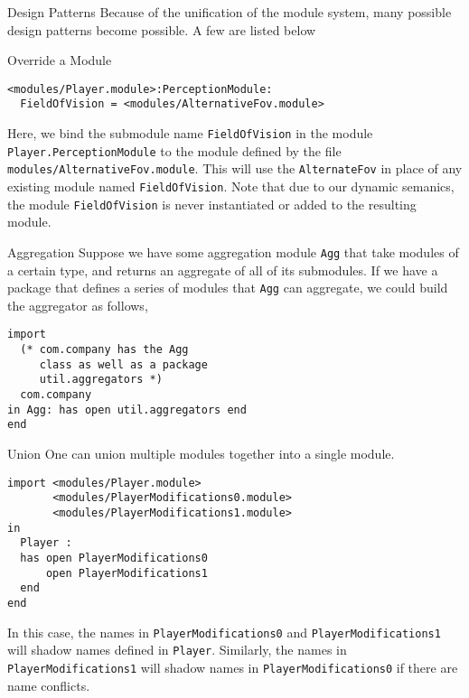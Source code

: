 \documentclass[11pt]{article}
\begin{document}
\begin{section}{Design Patterns}
Because of the unification of the module system, many possible design patterns become possible. A few are listed below
\begin{subsection}{Override a Module}
\begin{verbatim}
<modules/Player.module>:PerceptionModule:
  FieldOfVision = <modules/AlternativeFov.module>
\end{verbatim}
Here, we bind the submodule name \verb|FieldOfVision| in the module\\ \verb|Player.PerceptionModule| to the module defined by the file \\\verb|modules/AlternativeFov.module|. This will use the \verb|AlternateFov| in place of any existing module named \verb|FieldOfVision|. Note that due to our dynamic semanics, the module \verb|FieldOfVision| is never instantiated or added to the resulting module.
\end{subsection}
\begin{subsection}{Aggregation}
Suppose we have some aggregation module \verb|Agg| that take modules of a certain type, and returns an aggregate of all of its submodules. If we have a package that defines a series of modules that \verb|Agg| can aggregate, we could build the aggregator as follows,
\begin{verbatim}
import
  (* com.company has the Agg 
     class as well as a package
     util.aggregators *)
  com.company
in Agg: has open util.aggregators end
end
\end{verbatim}
\end{subsection}
\begin{subsection}{Union}
One can union multiple modules together into a single module. 
\begin{verbatim}
import <modules/Player.module>
       <modules/PlayerModifications0.module>
       <modules/PlayerModifications1.module>
in
  Player :
  has open PlayerModifications0
      open PlayerModifications1
  end
end
\end{verbatim}
In this case, the names in \verb|PlayerModifications0| and \verb|PlayerModifications1| will shadow names defined in \verb|Player|. Similarly, the names in \verb|PlayerModifications1| will shadow names in \verb|PlayerModifications0| if there are name conflicts.
\end{subsection}
\end{section} 
\end{document}

